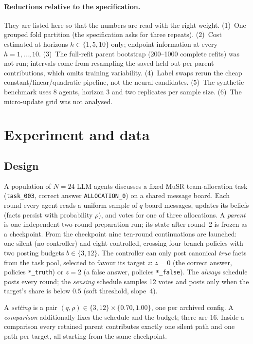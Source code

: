 \documentclass[10pt]{article}
\begin{document}
\paragraph{Reductions relative to the specification.} They are listed here so that the numbers are read with the right weight. (1)~One grouped fold partition (the specification asks for three repeats). (2)~Cost estimated at horizons $h\in\{1,5,10\}$ only; endpoint information at every $h=1,\dots,10$. (3)~The full-refit parent bootstrap (200--1000 complete refits) was not run; intervals come from resampling the saved held-out per-parent contributions, which omits training variability. (4)~Label swaps rerun the cheap constant/linear/quadratic pipeline, not the neural candidates. (5)~The synthetic benchmark uses 8 agents, horizon 3 and two replicates per sample size. (6)~The micro-update grid was not analysed.

\section{Experiment and data}
\subsection{Design}
A population of $N=24$ LLM agents discusses a fixed MuSR team-allocation task (\texttt{task\_003}, correct answer \texttt{ALLOCATION\_0}) on a shared message board. Each round every agent reads a uniform sample of $q$ board messages, updates its beliefs (facts persist with probability $\rho$), and votes for one of three allocations. A \emph{parent} is one independent two-round preparation run; its state after round~2 is frozen as a checkpoint. From the checkpoint nine ten-round continuations are launched: one silent (no controller) and eight controlled, crossing four branch policies with two posting budgets $b\in\{3,12\}$. The controller can only post canonical \emph{true} facts from the task pool, selected to favour its target $z$: $z=0$ (the correct answer, policies \texttt{*\_truth}) or $z=2$ (a false answer, policies \texttt{*\_false}). The \emph{always} schedule posts every round; the \emph{sensing} schedule samples 12 votes and posts only when the target's share is below $0.5$ (soft threshold, slope~4).

A \emph{setting} is a pair $(q,\rho)\in\{3,12\}\times\{0.70,1.00\}$, one per archived config. A \emph{comparison} additionally fixes the schedule and the budget; there are 16. Inside a comparison every retained parent contributes exactly one silent path and one path per target, all starting from the same checkpoint.
\end{document}
